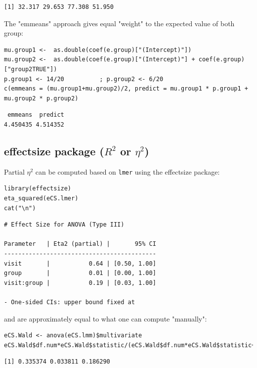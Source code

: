 \documentclass[12pt]{article}
\begin{document}
\begin{verbatim}
[1] 32.317 29.653 77.308 51.950
\end{verbatim}


The "emmeans" approach gives equal "weight" to the expected value of
both group:
\lstset{language=r,label= ,caption= ,captionpos=b,numbers=none}
\begin{lstlisting}
mu.group1 <-  as.double(coef(e.group)["(Intercept)"])
mu.group2 <-  as.double(coef(e.group)["(Intercept)"] + coef(e.group)["group2TRUE"])
p.group1 <- 14/20          ; p.group2 <- 6/20
c(emmeans = (mu.group1+mu.group2)/2, predict = mu.group1 * p.group1 + mu.group2 * p.group2)
\end{lstlisting}

\begin{verbatim}
 emmeans  predict 
4.450435 4.514352
\end{verbatim}


\clearpage

\subsection{effectsize package (\(R^2\) or \(\eta^2\))}
\label{sec:org0914d94}

Partial \(\eta^2\) can be computed based on \texttt{lmer} using the effectsize package:
\lstset{language=r,label= ,caption= ,captionpos=b,numbers=none}
\begin{lstlisting}
library(effectsize)
eta_squared(eCS.lmer)
cat("\n")
\end{lstlisting}

\begin{verbatim}
# Effect Size for ANOVA (Type III)

Parameter   | Eta2 (partial) |       95% CI
-------------------------------------------
visit       |           0.64 | [0.50, 1.00]
group       |           0.01 | [0.00, 1.00]
visit:group |           0.19 | [0.03, 1.00]

- One-sided CIs: upper bound fixed at
\end{verbatim}


and are approximately equal to what one can compute "manually":
\lstset{language=r,label= ,caption= ,captionpos=b,numbers=none}
\begin{lstlisting}
eCS.Wald <- anova(eCS.lmm)$multivariate
eCS.Wald$df.num*eCS.Wald$statistic/(eCS.Wald$df.num*eCS.Wald$statistic+eCS.Wald$df.denom)
\end{lstlisting}

\begin{verbatim}
[1] 0.335374 0.033811 0.186290
\end{verbatim}
\end{document}
